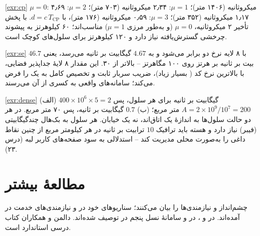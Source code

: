 \documentclass[11pt,a4paper]{article}
\begin{document}
\begin{solutionbox}{\ref{exr:cp}}
$\mu = 0$: ۴٫۶۹ میکروثانیه (۱۴۰۶ متر)؛ $\mu = 1$: ۲٫۳۴ میکروثانیه (۷۰۳ متر)؛ $\mu = 2$: ۱٫۱۷ میکروثانیه (۳۵۲ متر)؛ $\mu = 3$:
۰٫۵۹ میکروثانیه (۱۷۶ متر)، با $d = c\,T_{\mathrm{CP}}$. با پخش تأخیر ۲ میکروثانیه، $\mu = 0$ (و به‌طور مرزی $\mu = 1$) مناسب‌اند؛
۶۰ کیلوهرتز به پیشوند چرخشی گسترش‌یافته نیاز دارد و ۱۲۰ کیلوهرتز برای سلول‌های کوچک  است.
\end{solutionbox}

\begin{solutionbox}{\ref{exr:se}}
با ۸ لایه نرخ دو برابر می‌شود و به $4.67$ گیگابیت بر ثانیه می‌رسد، یعنی $46.7$ بیت بر ثانیه بر هرتز روی ۱۰۰ مگاهرتز -- بالاتر از
۳۰. این مقدار ۸ لایهٔ جداپذیر فضایی،  با بالاترین نرخ کد ( بسیار زیاد)، ضریب سربار ثابت و تخصیص کامل به
یک  را فرض می‌کند؛ سامانه‌های واقعی به کسری از آن می‌رسند.
\end{solutionbox}

\begin{solutionbox}{\ref{exr:dense}}
(الف) $400\times10^6\times5 = 2$ گیگابیت بر ثانیه برای هر سلول، پس $A = 2\times10^9/10^7 = 200$ متر مربع؛ (ب) $0.7$ گیگابیت بر
ثانیه، پس ۷۰ متر مربع. در هر دو حالت سلول‌ها به اندازهٔ یک اتاق‌اند، نه یک خیابان. هر سلول به بک‌هال چندگیگابیتی (فیبر)
نیاز دارد و هسته باید ترافیک $10$ ترابیت بر ثانیه در هر کیلومتر مربع از چنین نقاط داغی را به‌صورت محلی مدیریت کند -- استدلالی
به سود صفحه‌های کاربر لبه (درس ۲۳).
\end{solutionbox}

\section{مطالعهٔ بیشتر}
 \cite{itu2015m2083} چشم‌انداز و  \cite{itu2017m2410} نیازمندی‌ها را بیان می‌کنند؛ سناریوهای خود
 در  \cite{tr38913} و نیازمندی‌های خدمت در  \cite{ts22261} آمده‌اند.  در
 \cite{ts38300} و  \cite{ts38211}،  در  \cite{ts37340} و سامانهٔ نسل
پنجم در  \cite{ts23501} توصیف شده‌اند. دالمن و همکاران \cite{dahlman2020nr} کتاب درسی استاندارد  است.

\begin{latin}
\printbibliography[heading=subbibliography,title={References}]
\end{latin}
\end{document}
